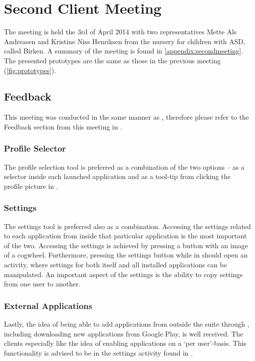 \section{Second Client Meeting}\label{sec:sprint2:secondmeeting}
The meeting is held the 3rd of April 2014 with two representatives Mette Als Andreasen and Kristine Niss Henriksen from the nursery for children with ASD, called Birken.
A summary of the meeting is found in \cref{appendix:secondmeeting}.
The presented prototypes are the same as those in the previous meeting (\cref{fig:prototypes}).

\subsection{Feedback}
This meeting was conducted in the same manner as , therefore please refer to the Feedback section from this meeting in .

\subsubsection{Profile Selector}
The profile selection tool is preferred as a combination of the two options -- as a selector inside each launched application and as a tool-tip from clicking the profile picture in \launcher.

\subsubsection{Settings}
The settings tool is preferred also as a combination.
Accessing the settings related to each application from inside that particular application is the most important of the two. 
Accessing the settings is achieved by pressing a button with an image of a cogwheel.
Furthermore, pressing the settings button while in \launcher should open an activity, where settings for both \launcher itself and all installed applications can be manipulated.
An important aspect of the settings is the ability to copy settings from one user to another.

\subsubsection{External Applications}
Lastly, the idea of being able to add applications from outside the \giraf suite through \launcher, including downloading new applications from Google Play, is well received.
The clients especially like the idea of enabling applications on a `per user'-basis.
This functionality is advised to be in the settings activity found in \launcher.

